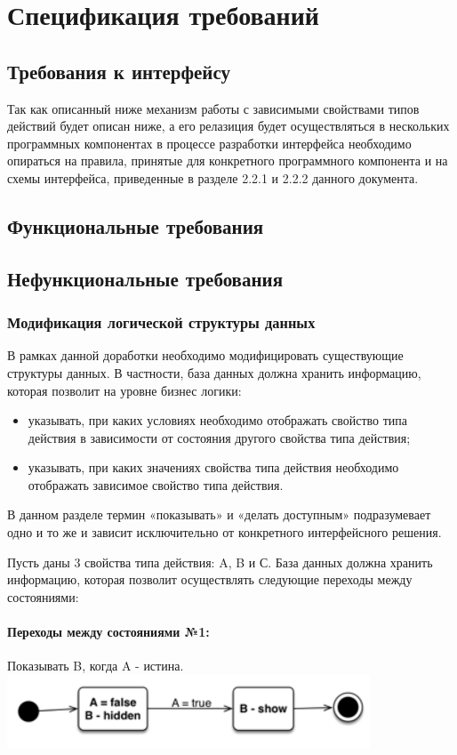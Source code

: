 \documentclass[a4paper,8pt]{report} %
\begin{document}
{ \section{Спецификация требований}
 \subsection{Требования к интерфейсу}
    Так как описанный ниже механизм работы с зависимыми свойствами типов действий
    будет описан ниже, а его релазиция будет осуществляться в нескольких программных
    компонентах в процессе разработки интерфейса необходимо опираться на правила,
    принятые для конкретного программного компонента и на схемы интерфейса,
    приведенные в разделе 2.2.1 и 2.2.2 данного документа.
 \subsection{Функциональные требования}
 \subsection{Нефункциональные требования}
 \subsubsection{Модификация логической структуры данных}
    В рамках данной доработки необходимо модифицировать существующие структуры
    данных. В частности, база данных должна хранить информацию, которая позволит на
    уровне бизнес логики:
    \begin{itemize}
       \item указывать, при каких условиях необходимо отображать свойство типа действия в
    зависимости от состояния другого свойства типа действия;
       \item указывать, при каких значениях свойства типа действия необходимо отображать
    зависимое свойство типа действия.
    \end{itemize}

    В данном разделе термин «показывать» и «делать доступным» подразумевает одно и то
    же и зависит исключительно от конкретного интерфейсного решения.

    Пусть даны 3 свойства типа действия: A, B и С.
    База данных должна хранить информацию, которая позволит осуществлять следующие
    переходы между состояниями:

    \paragraph*{Переходы между состояниями №1:} Показывать B, когда A - истина.
    \includegraphics{condition_1}

}
\end{document}
